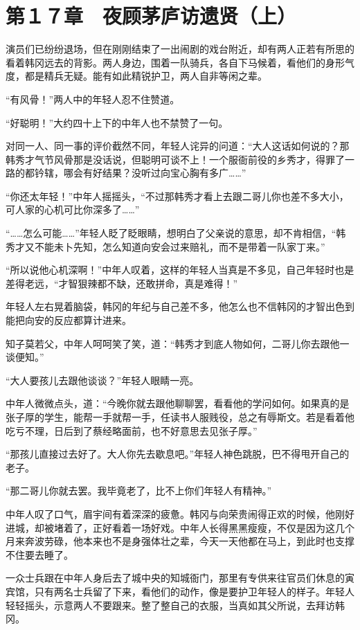 \section{第１７章　夜顾茅庐访遗贤（上）}

演员们已纷纷退场，但在刚刚结束了一出闹剧的戏台附近，却有两人正若有所思的看着韩冈远去的背影。两人身边，围着一队骑兵，各自下马候着，看他们的身形气度，都是精兵无疑。能有如此精锐护卫，两人自非等闲之辈。

“有风骨！”两人中的年轻人忍不住赞道。

“好聪明！”大约四十上下的中年人也不禁赞了一句。

对同一人、同一事的评价截然不同，年轻人诧异的问道：“大人这话如何说的？那韩秀才气节风骨那是没话说，但聪明可谈不上！一个服衙前役的乡秀才，得罪了一路的都钤辖，哪会有好结果？没听过向宝心胸有多广……”

“你还太年轻！”中年人摇摇头，“不过那韩秀才看上去跟二哥儿你也差不多大小，可人家的心机可比你深多了……”

“……怎么可能……”年轻人眨了眨眼睛，想明白了父亲说的意思，却不肯相信，“韩秀才又不能未卜先知，怎么知道向安会过来赔礼，而不是带着一队家丁来。”

“所以说他心机深啊！”中年人叹着，这样的年轻人当真是不多见，自己年轻时也是差得老远，“才智狠辣都不缺，还敢拼命，真是难得！”

年轻人左右晃着脑袋，韩冈的年纪与自己差不多，他怎么也不信韩冈的才智出色到能把向安的反应都算计进来。

知子莫若父，中年人呵呵笑了笑，道：“韩秀才到底人物如何，二哥儿你去跟他一谈便知。”

“大人要孩儿去跟他谈谈？”年轻人眼睛一亮。

中年人微微点头，道：“今晚你就去跟他聊聊罢，看看他的学问如何。如果真的是张子厚的学生，能帮一手就帮一手，任读书人服贱役，总之有辱斯文。若是看着他吃亏不理，日后到了蔡经略面前，也不好意思去见张子厚。”

“那孩儿直接过去好了。大人你先去歇息吧。”年轻人神色跳脱，巴不得甩开自己的老子。

“那二哥儿你就去罢。我毕竟老了，比不上你们年轻人有精神。”

中年人叹了口气，眉宇间有着深深的疲惫。韩冈与向荣贵闹得正欢的时候，他刚好进城，却被堵着了，正好看着一场好戏。中年人长得黑黑瘦瘦，不仅是因为这几个月来奔波劳碌，他本来也不是身强体壮之辈，今天一天他都在马上，到此时也支撑不住要去睡了。

一众士兵跟在中年人身后去了城中央的知城衙门，那里有专供来往官员们休息的寅宾馆，只有两名士兵留了下来，看他们的动作，像是要护卫年轻人的样子。年轻人轻轻摇头，示意两人不要跟来。整了整自己的衣服，当真如其父所说，去拜访韩冈。

